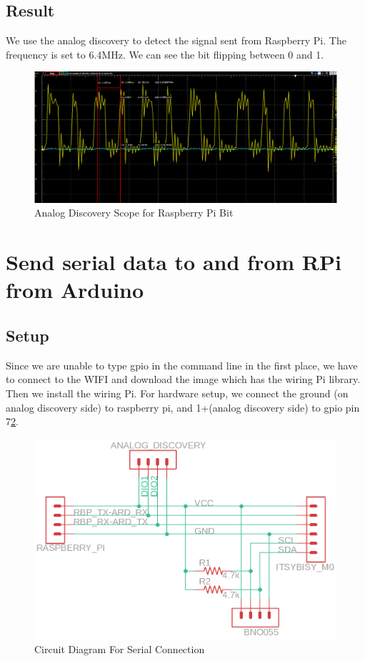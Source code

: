\documentclass{article}
\begin{document}
	\subsection{Result}
	We use the analog discovery to detect the signal sent from Raspberry Pi. The frequency is set to 6.4MHz. We can see the bit flipping between 0 and 1.
	\begin{figure}[hb]
		\includegraphics[width=\textwidth]{img/Lab3_FlipaBit.PNG}
		\caption{Analog Discovery Scope for Raspberry Pi Bit} 
		\label{CNN5}
	\end{figure}
	\clearpage
	\section{Send serial data to and from RPi from Arduino}
	\subsection{Setup}
	Since we are unable to type gpio in the command line in the first place, we have to connect to the WIFI and download the image which has the wiring Pi library. Then we install the wiring Pi. For hardware setup, we connect the ground (on analog discovery side) to raspberry pi, and 1+(analog discovery side) to gpio pin 7\ref{CNN5}.
	\begin{figure}[hb]
		\includegraphics[width=\textwidth]{img/Lab3_SerialConnection.png}
		\caption{Circuit Diagram For Serial Connection} 
		\label{CNN5}
	\end{figure}
	
\end{document}
